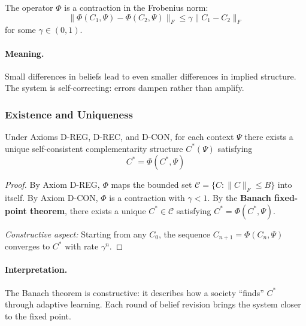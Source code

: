 \begin{axiom}
\label{ax:D-contraction}
The operator $\Phi$ is a contraction in the Frobenius norm:
\begin{equation}
\|\Phi(C_1, \Psi) - \Phi(C_2, \Psi)\|_F \leq \gamma \|C_1 - C_2\|_F
\end{equation}
for some $\gamma \in (0,1)$.
\end{axiom}

\paragraph{Meaning.}
Small differences in beliefs lead to even smaller differences in implied structure.
The system is self-correcting: errors dampen rather than amplify.

\subsubsection{Existence and Uniqueness}

\begin{theorem}
\label{thm:D-existence}
Under Axioms D-REG, D-REC, and D-CON, for each context $\Psi$ there exists
a unique self-consistent complementarity structure $C^*(\Psi)$ satisfying
\begin{equation}
C^* = \Phi(C^*, \Psi)
\end{equation}
\end{theorem}

\begin{proof}
By Axiom D-REG, $\Phi$ maps the bounded set
$\mathcal{C} = \{C : \|C\|_F \leq B\}$ into itself.
By Axiom D-CON, $\Phi$ is a contraction with $\gamma < 1$.
By the \textbf{Banach fixed-point theorem}, there exists a unique
$C^* \in \mathcal{C}$ satisfying $C^* = \Phi(C^*, \Psi)$.

\textit{Constructive aspect:} Starting from any $C_0$, the sequence
$C_{n+1} = \Phi(C_n, \Psi)$ converges to $C^*$ with rate $\gamma^n$.
\end{proof}

\paragraph{Interpretation.}
The Banach theorem is constructive: it describes how a society ``finds''
$C^*$ through adaptive learning. Each round of belief revision brings
the system closer to the fixed point.



